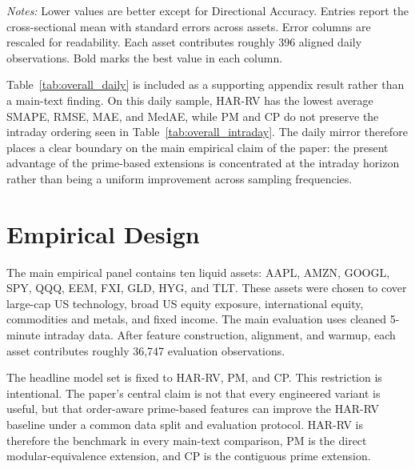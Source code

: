 ﻿\documentclass[a4paper]{article}
\begin{document}
{\renewcommand{\thetable}{1B}
\begin{center}
\label{tab:overall_daily}
\small
\renewcommand{\arraystretch}{1.15}
\setlength{\tabcolsep}{6pt}
\resizebox{0.98\textwidth}{!}{}

\vspace{0.1cm}
\footnotesize \parbox{0.92\textwidth}{\textit{Notes:} Lower values are better except for Directional Accuracy. Entries report the cross-sectional mean with standard errors across assets. Error columns are rescaled for readability. Each asset contributes roughly 396 aligned daily observations. Bold marks the best value in each column.}
\end{center}}

\noindent
Table~\ref{tab:overall_daily} is included as a supporting appendix result rather than a main-text finding. On this daily sample, HAR-RV has the lowest average SMAPE, RMSE, MAE, and MedAE, while PM and CP do not preserve the intraday ordering seen in Table~\ref{tab:overall_intraday}. The daily mirror therefore places a clear boundary on the main empirical claim of the paper: the present advantage of the prime-based extensions is concentrated at the intraday horizon rather than being a uniform improvement across sampling frequencies.

\section{Empirical Design}

\noindent
The main empirical panel contains ten liquid assets: AAPL, AMZN, GOOGL, SPY, QQQ, EEM, FXI, GLD, HYG, and TLT. These assets were chosen to cover large-cap US technology, broad US equity exposure, international equity, commodities and metals, and fixed income. The main evaluation uses cleaned 5-minute intraday data. After feature construction, alignment, and warmup, each asset contributes roughly 36,747 evaluation observations.

\noindent
The headline model set is fixed to HAR-RV, PM, and CP. This restriction is intentional. The paper's central claim is not that every engineered variant is useful, but that order-aware prime-based features can improve the HAR-RV baseline under a common data split and evaluation protocol. HAR-RV is therefore the benchmark in every main-text comparison, PM is the direct modular-equivalence extension, and CP is the contiguous prime extension.
\end{document}
